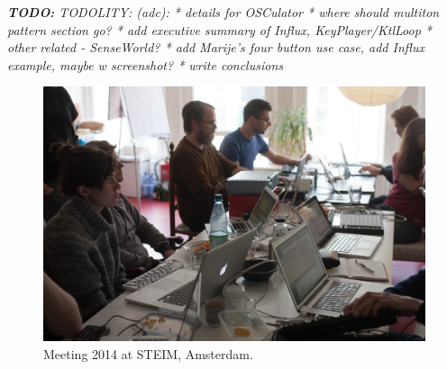 \documentclass{article}
\title{\papertitle}
\newcommand{\todo}[1] {\emph{\textbf{TODO:} #1}}
\begin{document}
%
\capstartfalse
\maketitle
\capstarttrue
%
\todo{ {TODOLITY:} (adc):
* details for OSCulator
* where should multiton pattern section go?
* add executive summary of Influx, KeyPlayer/KtlLoop
* other related - SenseWorld? 
* add Marije's four button use case, add Influx example, maybe w screenshot?
* write conclusions
}

\begin{abstract}

The Modality Project explores the idea of highly modal performance instruments; i.e. instrument setups in which a small set of controllers can be used to play a wide variety of sound processes by changing control constellations on the fly, in performance. 
The Modality Toolkit is a SuperCollider library which simplifies the creation of individual electronic instruments by combining custom sound engines with off-the-shelf controllers in  simple-to-write, flexible configurations.

This paper gives an overview on the concept of modality as seen by a group of sound artists and researchers, and describes one interdisciplinary approach to creating a toolkit written for and by electronic musicians.

\end{abstract}

\begin{figure}[h]
	\centering
		\includegraphics[width=.9\columnwidth]{../media/20140331-IMG_5976.jpg}
	\caption{Meeting 2014 at STEIM, Amsterdam.}
	\label{fig:media_20140331-IMG_5976}
\end{figure}
\end{document}
